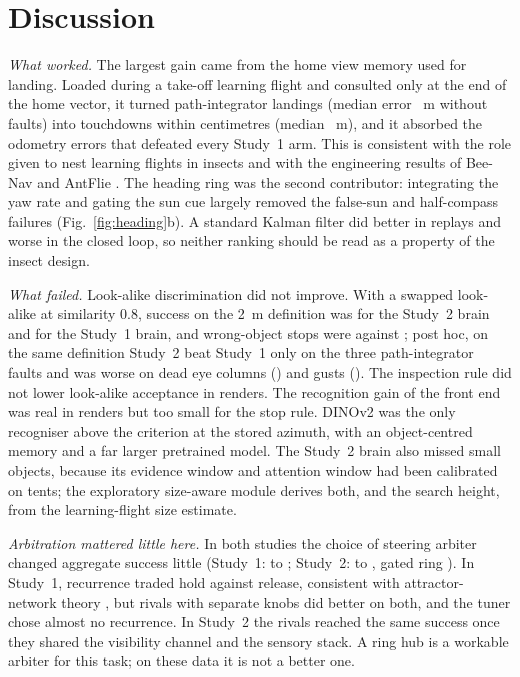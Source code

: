 \documentclass[10pt,twocolumn]{article}
\begin{document}
\section{Discussion}

\emph{What worked.} The largest gain came from the home view memory used for landing. Loaded during a take-off learning flight and consulted only at the end of the home vector, it turned path-integrator landings (median error \StwoPIErr{}~m without faults) into touchdowns within centimetres (median \StwoLandErr{}~m), and it absorbed the odometry errors that defeated every Study~1 arm. This is consistent with the role given to nest learning flights in insects \citep{philippides2013,collett2018} and with the engineering results of Bee-Nav and AntFlie \citep{beenav2026,antflie2026}. The heading ring was the second contributor: integrating the yaw rate and gating the sun cue largely removed the false-sun and half-compass failures (Fig.~\ref{fig:heading}b). A standard Kalman filter did better in replays and worse in the closed loop, so neither ranking should be read as a property of the insect design.

\emph{What failed.} Look-alike discrimination did not improve. With a swapped look-alike at similarity 0.8, success on the 2~m definition was \StwoMidDecoyOwn{} for the Study~2 brain and \StwoVoneMidDecoyOwn{} for the Study~1 brain, and wrong-object stops were \StwoWrongRing{} against \StwoWrongVone; post hoc, on the same definition Study~2 beat Study~1 only on the three path-integrator faults and was worse on dead eye columns (\StwoOwnDiffEye) and gusts (\StwoOwnDiffGust). The inspection rule did not lower look-alike acceptance in renders. The recognition gain of the front end was real in renders but too small for the stop rule. DINOv2 was the only recogniser above the criterion at the stored azimuth, with an object-centred memory and a far larger pretrained model. The Study~2 brain also missed small objects, because its evidence window and attention window had been calibrated on tents; the exploratory size-aware module derives both, and the search height, from the learning-flight size estimate.

\emph{Arbitration mattered little here.} In both studies the choice of steering arbiter changed aggregate success little (Study~1: \SoneAUCRing{} to \SoneAUCSM; Study~2: \StwoRivalLo{} to \StwoRivalHi, gated ring \StwoAUC). In Study~1, recurrence traded hold against release, consistent with attractor-network theory \citep{zhang1996,compte2000}, but rivals with separate knobs did better on both, and the tuner chose almost no recurrence. In Study~2 the rivals reached the same success once they shared the visibility channel and the sensory stack. A ring hub is a workable arbiter for this task; on these data it is not a better one.
\end{document}
